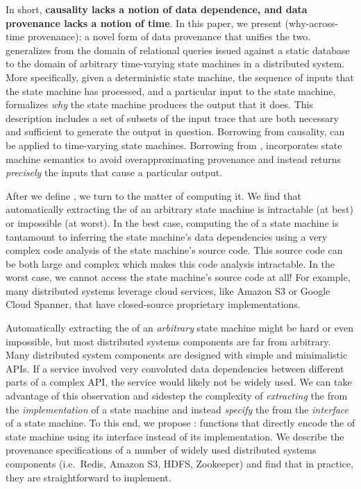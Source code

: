 In short, \textbf{causality lacks a notion of data dependence, and data
provenance lacks a notion of time}. In this paper, we present
 (why-across-time provenance): a novel form of data
provenance that unifies the two. \Watprovenance{} generalizes \whyprovenance{}
from the domain of relational queries issued against a static database to the
domain of arbitrary time-varying state machines in a distributed system. More
specifically, given a deterministic state machine, the sequence of inputs that
the state machine has processed, and a particular input to the state machine,
\watprovenance{} formalizes \emph{why} the state machine produces the output
that it does. This description includes a set of subsets of the input trace
that are both necessary and sufficient to generate the output in question.
Borrowing from causality, \watprovenance{} can be applied to time-varying state
machines. Borrowing from \whyprovenance{}, \watprovenance{} incorporates state
machine semantics to avoid overapproximating provenance and instead returns
\emph{precisely} the inputs that cause a particular output.

After we define \watprovenance{}, we turn to the matter of computing it. We
find that automatically extracting the \watprovenance{} of an arbitrary state
machine is intractable (at best) or impossible (at worst). In the best case,
computing the \watprovenance{} of a state machine is tantamount to inferring
the state machine's data dependencies using a very complex code analysis of the
state machine's source code. This source code can be both large and complex
which makes this code analysis intractable. In the worst case, we cannot access
the state machine's source code at all! For example, many distributed systems
leverage cloud services, like Amazon S3 or Google Cloud Spanner, that have
closed-source proprietary implementations.

Automatically extracting the \watprovenance{} of an \emph{arbitrary} state
machine might be hard or even impossible, but most distributed systems
components are far from arbitrary. Many distributed system components are
designed with simple and minimalistic APIs. If a service involved very
convoluted data dependencies between different parts of a complex API, the
service would likely not be widely used. We can take advantage of this
observation and sidestep the complexity of \emph{extracting} the
\watprovenance{} from the \emph{implementation} of a state machine and instead
\emph{specify} the \watprovenance{} from the \emph{interface} of a state
machine. To this end, we propose :
functions that directly encode the \watprovenance{} of state machine using its
interface instead of its implementation.  We describe the provenance
specifications of a number of widely used distributed systems components (i.e.\
Redis, Amazon S3, HDFS, Zookeeper) and find that in practice, they are
straightforward to implement.

